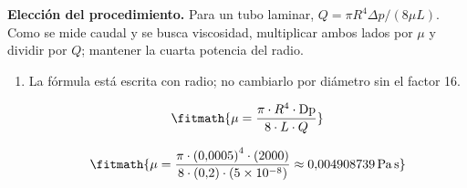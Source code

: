 \noindent\textbf{Elección del procedimiento.} Para un tubo laminar, $Q=\pi R^4\Delta p/(8\mu L)$. Como se mide caudal y se busca viscosidad, multiplicar ambos lados por $\mu$ y dividir por $Q$; mantener la cuarta potencia del radio.

\begin{enumerate}

\item La fórmula está escrita con radio; no cambiarlo por diámetro sin el factor 16.

\[\fitmath{\mu=\frac{\pi\cdot {R}^{4}\cdot \mathrm{Dp}}{8\cdot L\cdot Q}}\]

\[\fitmath{\mu=\frac{\pi\cdot {(0{,}0005)}^{4}\cdot (2000)}{8\cdot (0{,}2)\cdot (5\times10^{-8})}\approx 0{,}004908739\,\mathrm{Pa\,s}}\]

\end{enumerate}
